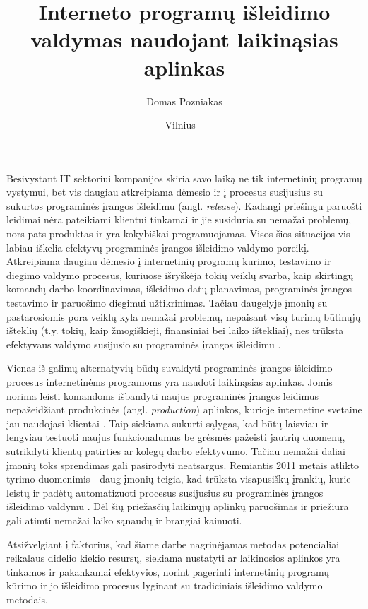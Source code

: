 \documentclass{VUMIFPSkursinis}
\institute{Informatikos institutas}
\title{Interneto programų išleidimo valdymas naudojant laikinąsias aplinkas}
\author{Domas Pozniakas}
\date{Vilnius – \the\year}
\begin{document}
\maketitle

\tableofcontents

Besivystant IT sektoriui kompanijos skiria savo laiką ne tik internetinių programų vystymui, bet vis daugiau atkreipiama dėmesio ir į procesus susijusius su sukurtos programinės įrangos išleidimu (angl. \textit{release}). Kadangi priešingu paruošti leidimai nėra pateikiami klientui tinkamai ir jie susiduria su nemažai problemų, nors pats produktas ir yra kokybiškai programuojamas. Visos šios situacijos vis labiau iškelia efektyvų programinės įrangos išleidimo valdymo poreikį. Atkreipiama daugiau dėmesio į internetinių programų kūrimo, testavimo ir diegimo valdymo procesus, kuriuose išryškėja tokių veiklų svarba, kaip skirtingų komandų darbo koordinavimas, išleidimo datų planavimas, programinės įrangos testavimo ir paruošimo diegimui užtikrinimas. Tačiau daugelyje įmonių su pastarosiomis pora veiklų kyla nemažai problemų, nepaisant visų turimų būtinųjų išteklių (t.y. tokių, kaip žmogiškieji, finansiniai bei laiko ištekliai), nes trūksta efektyvaus valdymo susijusio su programinės įrangos išleidimu \cite{SaltPirmas}. 


Vienas iš galimų alternatyvių būdų suvaldyti programinės įrangos išleidimo procesus internetinėms programoms yra naudoti laikinąsias aplinkas. Jomis norima leisti komandoms išbandyti naujus programinės įrangos leidimus nepažeidžiant produkcinės (angl. \textit{production}) aplinkos, kurioje internetine svetaine jau naudojasi klientai \cite{SaltAntras}. Taip siekiama sukurti sąlygas, kad būtų laisviau ir lengviau testuoti naujus funkcionalumus be grėsmės pažeisti jautrių duomenų, sutrikdyti klientų patirties ar kolegų darbo efektyvumo. Tačiau nemažai daliai įmonių toks sprendimas gali pasirodyti neatsargus. Remiantis 2011 metais atlikto tyrimo duomenimis - daug įmonių teigia, kad trūksta visapusiškų įrankių, kurie leistų ir padėtų automatizuoti procesus susijusius su programinės įrangos išleidimo valdymu \cite{SaltPirmas}. Dėl šių priežasčių laikinųjų aplinkų paruošimas ir priežiūra gali atimti nemažai laiko sąnaudų ir brangiai kainuoti.

 Atsižvelgiant į faktorius, kad šiame darbe nagrinėjamas metodas potencialiai reikalaus didelio kiekio resursų, siekiama nustatyti ar laikinosios aplinkos yra tinkamos ir pakankamai efektyvios, norint pagerinti internetinių programų kūrimo ir jo išleidimo procesus lyginant su tradiciniais išleidimo valdymo metodais.
\end{document}
